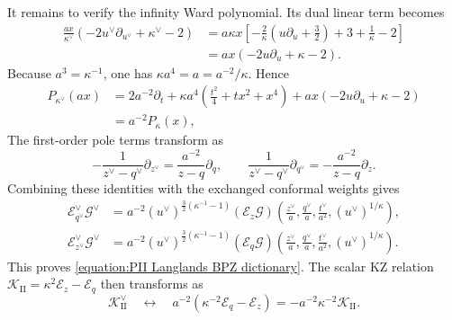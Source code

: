 \documentclass[a4paper,11pt]{article}
\numberwithin{equation}{section}
\begin{document}
It remains to verify the infinity Ward polynomial.  Its dual linear
term becomes
\begin{equation}
	\begin{aligned}
		\frac{ax}{\kappa^{\vee}}
		(-2u^{\vee}\partial_{u^{\vee}}+\kappa^{\vee}-2)
		&=a\kappa x\left[
		-\frac{2}{\kappa}\left(u\partial_{u}+\frac{3}{2}\right)
		+3+\frac{1}{\kappa}-2\right]\\
		&=ax(-2u\partial_{u}+\kappa-2).
	\end{aligned}
\end{equation}
Because $a^{3}=\kappa^{-1}$, one has
$\kappa a^{4}=a=a^{-2}/\kappa$.  Hence
\begin{equation}
	\label{equation:PII Langlands Ward covariance}
	\begin{aligned}
		P_{\kappa^{\vee}}(ax)
		&=2a^{-2}\partial_{t}
		+\kappa a^{4}\left(\frac{t^{2}}{4}+tx^{2}+x^{4}\right)
		+ax(-2u\partial_{u}+\kappa-2)\\
		&=a^{-2}P_{\kappa}(x),
	\end{aligned}
\end{equation}
The first-order pole terms transform as
\begin{equation}
	-\frac{1}{z^{\vee}-q^{\vee}}\partial_{z^{\vee}}
	=\frac{a^{-2}}{z-q}\partial_{q},
	\qquad
	\frac{1}{z^{\vee}-q^{\vee}}\partial_{q^{\vee}}
	=-\frac{a^{-2}}{z-q}\partial_{z}.
\end{equation}
Combining these identities with the exchanged conformal weights gives
\begin{equation}
	\begin{aligned}
		\mathcal{E}_{q^{\vee}}^{\vee}\mathcal{G}^{\vee}
		&=a^{-2}(u^{\vee})^{\frac{3}{2}(\kappa^{-1}-1)}
		(\mathcal{E}_{z}\mathcal{G})\!\left(
		\frac{z^{\vee}}{a},\frac{q^{\vee}}{a},
		\frac{t^{\vee}}{a^{2}},(u^{\vee})^{1/\kappa}\right),\\
		\mathcal{E}_{z^{\vee}}^{\vee}\mathcal{G}^{\vee}
		&=a^{-2}(u^{\vee})^{\frac{3}{2}(\kappa^{-1}-1)}
		(\mathcal{E}_{q}\mathcal{G})\!\left(
		\frac{z^{\vee}}{a},\frac{q^{\vee}}{a},
		\frac{t^{\vee}}{a^{2}},(u^{\vee})^{1/\kappa}\right).
	\end{aligned}
\end{equation}
This proves \eqref{equation:PII Langlands BPZ dictionary}.
The scalar KZ relation
$\mathcal{K}_{\mathrm{II}}=\kappa^{2}\mathcal{E}_{z}-\mathcal{E}_{q}$
then transforms as
\begin{equation}
	\mathcal{K}_{\mathrm{II}}^{\vee}
	\quad\longleftrightarrow\quad
	a^{-2}\left(\kappa^{-2}\mathcal{E}_{q}-\mathcal{E}_{z}\right)
	=-a^{-2}\kappa^{-2}\mathcal{K}_{\mathrm{II}}.
\end{equation}
\end{document}

